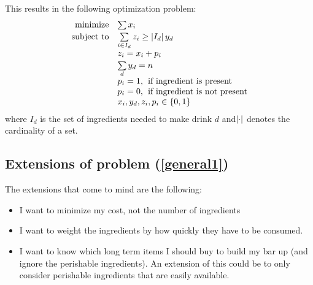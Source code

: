 \documentclass{article}
\begin{document}
This results in the following optimization problem:
\begin{equation}\label{general1}
\begin{array}{rl}
\text{minimize} & \sum x_i \\
\text{subject to} & \sum \limits_{i\in I_d}^{} z_i \geq \left| I_d \right|y_d \\
& z_i = x_i + p_i \\
& \sum \limits_{d}^{} y_d = n \\
& p_i = 1, \hspace{0.15cm} \text{if ingredient is present} \\
& p_i = 0, \hspace{0.15cm} \text{if ingredient is not present} \\
& x_i,y_d,z_i,p_i \in \{0,1\}
\end{array}
\end{equation}
where $I_d$ is the set of ingredients needed to make drink $d$ and$\left| \cdot \right|$ denotes the cardinality of a set.
\subsection{Extensions of problem (\ref{general1})}
The extensions that come to mind are the following:
\begin{itemize}
\item{I want to minimize my cost, not the number of ingredients}
\item{I want to weight the ingredients by how quickly they have to be consumed.}
\item{I want to know which long term items I should buy to build my bar up (and ignore the perishable ingredients). An extension of this could be to only consider perishable ingredients that are easily available.}
\end{itemize}
\end{document}
